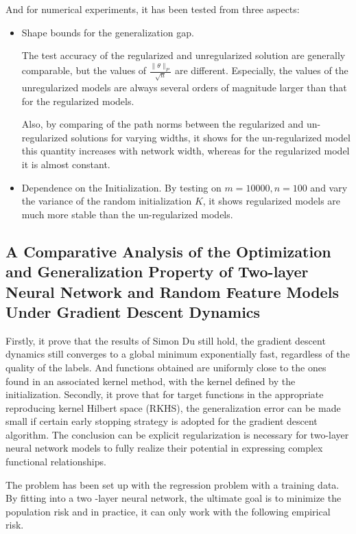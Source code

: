 \documentclass{article}
\begin{document}
And for numerical experiments, it has been tested from three aspects:
\begin{itemize}
\item Shape bounds for the generalization gap.

The test accuracy of the regularized and unregularized solution are generally comparable, but the values of $\frac{\|\theta\|_P}{\sqrt{n}}$ are different. Especially, the values of the unregularized models are always several orders of magnitude larger than that for the regularized models.

Also, by comparing of the path norms between the regularized and un-regularized solutions for varying widths, it shows for the un-regularized model this quantity increases with network width, whereas for the regularized model it is almost constant. 
\item Dependence on the Initialization.
By testing on $m=10000,n= 100$ and vary the variance of the random initialization $K$, it shows regularized models are much more stable than the un-regularized models. 
\end{itemize}

\subsection{A Comparative Analysis of the Optimization and Generalization Property of Two-layer Neural Network and Random Feature Models Under Gradient Descent Dynamics}

Firstly, it prove that the results of Simon Du still hold, the gradient descent dynamics still converges to a global minimum exponentially fast, regardless of the quality of the labels. And functions obtained are uniformly close to the ones found in an associated kernel method, with the kernel defined by the initialization. Secondly, it prove that for target functions in the appropriate reproducing kernel Hilbert space (RKHS), the generalization error can be made small if certain early stopping strategy is adopted for the gradient descent algorithm. The conclusion can be explicit regularization is necessary for two-layer neural network models to fully realize their potential in expressing complex functional relationships. 

The problem has been set up with the regression problem with a training data. By fitting into a two -layer neural network, the ultimate goal is to minimize the population risk and in practice, it can only work with the following empirical risk. 
\end{document}
